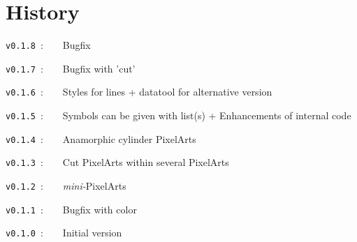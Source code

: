\documentclass{article}
\begin{document}
\begin{PresentationCode}{}


\end{PresentationCode}

\newpage

\part{History}

\verb|v0.1.8|~:~~~~Bugfix

\verb|v0.1.7|~:~~~~Bugfix with 'cut'

\verb|v0.1.6|~:~~~~Styles for lines + \textsf{datatool} for alternative version

\verb|v0.1.5|~:~~~~Symbols can be given with list(s) + Enhancements of internal code

\verb|v0.1.4|~:~~~~Anamorphic cylinder PixelArts

\verb|v0.1.3|~:~~~~Cut PixelArts within several PixelArts

\verb|v0.1.2|~:~~~~\textit{mini-}PixelArts

\verb|v0.1.1|~:~~~~Bugfix with color

\verb|v0.1.0|~:~~~~Initial version
\end{document}
